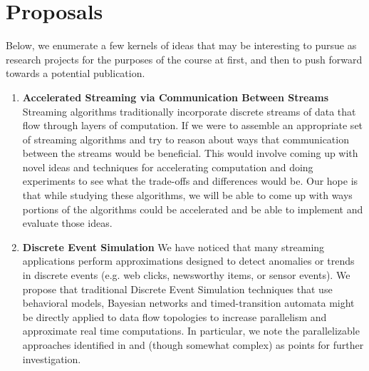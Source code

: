 \documentclass[11pt,letterpaper]{article}
\begin{document}
\section{Proposals}

Below, we enumerate a few kernels of ideas that may be interesting to pursue as research projects for the purposes of the course at first, and then to push forward towards a potential publication.

\begin{enumerate}
  \item \textbf{Accelerated Streaming via Communication Between Streams}
   Streaming algorithms traditionally incorporate discrete streams of data that flow through layers of computation. If we were to assemble an appropriate set of streaming algorithms and try to reason about ways that communication between the streams would be beneficial. This would involve coming up with novel ideas and techniques for accelerating computation and doing experiments to see what the trade-offs and differences would be. Our hope is that while studying these algorithms, we will be able to come up with ways portions of the algorithms could be accelerated and be able to implement and evaluate those ideas.

   \item \textbf{Discrete Event Simulation} We have noticed that many streaming applications perform approximations designed to detect anomalies or trends in discrete events (e.g. web clicks, newsworthy items, or sensor events). We propose that traditional Discrete Event Simulation techniques that use behavioral models, Bayesian networks and timed-transition automata might be directly applied to data flow topologies to increase parallelism and approximate real time computations. In particular, we note the parallelizable approaches identified in \cite{klerx2014model} and \cite{zeigler2004discrete} (though somewhat complex) as points for further investigation.
\end{enumerate}



\end{document}
